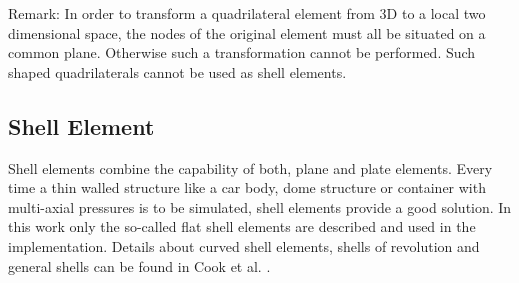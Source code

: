   Remark: In order to transform a quadrilateral element from 3D to a local two dimensional space, the nodes of the original element must all be situated on a common plane. Otherwise such a transformation cannot be performed. Such shaped quadrilaterals cannot be used as shell elements.
 
 
 \subsection{Shell Element}\label{sec:Shell-Shell}
 Shell elements combine the capability of both, plane and plate elements. Every time a thin walled structure like a car body, dome structure or container with multi-axial pressures is to be simulated, shell elements provide a good solution. In this work only the so-called flat shell elements are described and used in the implementation. Details about curved shell elements, shells of revolution and general shells can be found in Cook et al. \cite{cook2002concepts}.
 
